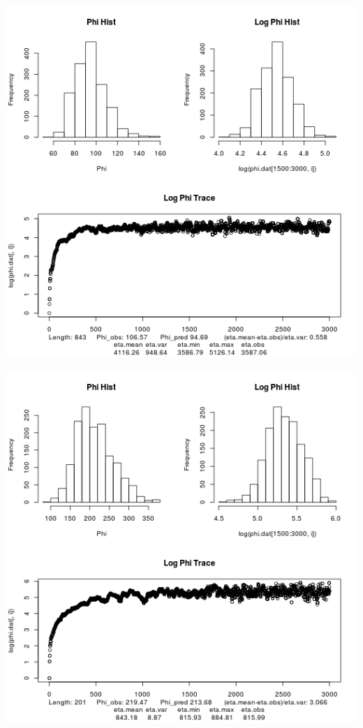 \documentclass{article}
\begin{document}
 		\includegraphics[scale=0.5]{../chosen_100/3000_steps/BIS10/reflnorm_prop/phistart-1/hist/8_phi_hist.png}
 		
		\includegraphics[scale=0.5]{../chosen_100/3000_steps/BIS10/reflnorm_prop/phistart-1/hist/100_phi_hist.png}
\end{document}
